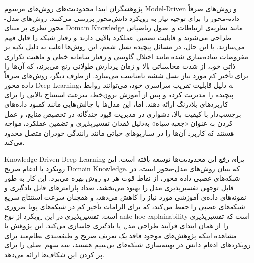 پژوهشگران ابتدا محدودیت‌های روش‌های مرسوم 
\gls{Model-Driven}
 و روش‌های صرفاً داده-محور را برای توجیه نیاز به رویکرد دانش‌محور بررسی می‌کنند. روش‌های مدل-محور نظری بر مبنای 
\gls{Domain Knowledge}
  مانند نظریه‌ی ارتباطات و اصول ریاضیاتی طراحی می‌شوند و قابلیت تضمین عملکرد بالایی دارند و رفتار شبکه را قابل فهم می‌سازند. با این حال، در مسائل پیچیده نسل شمم، این روش‌ها اغلب به دلیل تکیه بر مفروضات ساده‌سازی شده مانند اختلال گاوسی و رفتار سامانه خطی و ماهیت تکراری ذاتی خود، از شدت محاسباتی بالا و زمان پردازش طولانی رنج می‌برند، که آن‌ها را برای تأخیر کم مورد نیاز نسل ششم نامناسب می‌سازد. از طرف دیگر، روش‌های صرفاً داده-محور 
\gls{Deep Learning}،
 به دلیل قابلیت تقریب سراسری خود، می‌توانند روابط پیچیده را مدیریت کرده و پس از آموزش برون‌خط، سرعت استنتاج بالایی را برای کاربردهای بلادرنگ ارائه دهند. اما، این مدل‌ها با چالش‌هایی مانند کمبود داده‌های برچسب‌دار با کیفیت بالا، دشواری در مدیریت قیود چندگانه در تخصیص منابع، و عمل کردن به عنوان «جعبه سیاه» به‌دلیل فقدان تفسیرپذیری و تضمین عملکرد، مواجه هستند که کاربرد آن‌ها را در سناریوهای حیاتی مانند رانندگی خودران متصل محدود می‌کند.
 
\gls{Knowledge-Driven Deep Learning}
	 برای رفع این محدودیت‌ها توسعه یافته است. این رویکرد با ادغام صریح 
\gls{Domain Knowledge}،
	  که بنیان روش‌های مدل-محور است، در شبکه‌های عصبی داده-محور، از نقاط قوت هر دو روش بهره می‌برد. این کار به طور قابل توجهی تفسیرپذیری مدل را بهبود می‌بخشد، تعداد پارامترهای قابل یادگیری و نمونه‌های داده‌ی آموزشی مورد نیاز را کاهش می‌دهد، و همچنان سرعت استنتاج سریع شبکه‌های عصبی را حفظ می‌کند، که برای الزامات تأخیر کم در شبکه‌های پویا ضروری است. تفسیرپذیری در این رویکرد از نوع 
\gls{ante-hoc explainability}
	  است که تفسیرپذیری را از همان ابتدای فرآیند طراحی مدل یا یادگیری جاسازی می‌کند.
این پژوهش با مشاهده اینکه پژوهش‌های موجود فاقد یک تعریف صریح و طبقه‌بندی نظام‌مند برای رویکردهای ادغام دانش در بهینه‌سازی شبکه‌های بی‌سیم هستند، سه سهم اصلی را برای پر کردن این شکاف‌ها ارائه می‌دهد.

